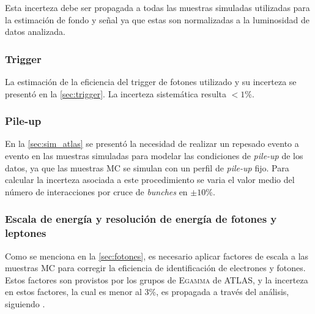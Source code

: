 Esta incerteza debe ser propagada a todas las muestras simuladas utilizadas
para la estimación de fondo y señal ya que estas son normalizadas a la
luminosidad de datos analizada.


\subsubsection{Trigger}

La estimación de la eficiencia del trigger de fotones utilizado y su incerteza se presentó
en la \cref{sec:trigger}. La incerteza sistemática resulta $< 1\%$. %



\subsubsection{Pile-up}

En la \cref{sec:sim_atlas} se presentó la necesidad de realizar un repesado
evento a evento en las muestras simuladas para modelar las condiciones de
\emph{pile-up} de los datos, ya que las muestras MC se simulan con un perfil de
\emph{pile-up} fijo. Para calcular la incerteza asociada a este procedimiento se
varia el valor medio del número de interacciones por cruce de \emph{bunches} en
$\pm 10\%$.



\subsubsection{Escala de energía y resolución de energía de fotones y leptones}

Como se menciona en la \cref{sec:fotones}, es necesario aplicar factores de
escala a las muestras MC para corregir la eficiencia de  identificación
de electrones y fotones. Estos factores son provistos por los grupos
de \textsc{Egamma} de ATLAS, y la incerteza en estos factores, la cual es menor al 3\%, es propagada
a través del análisis, siguiendo \cite{PhoEffTwiki,EleEffTwiki,EGScaleTwiki,MCPTwiki}.

